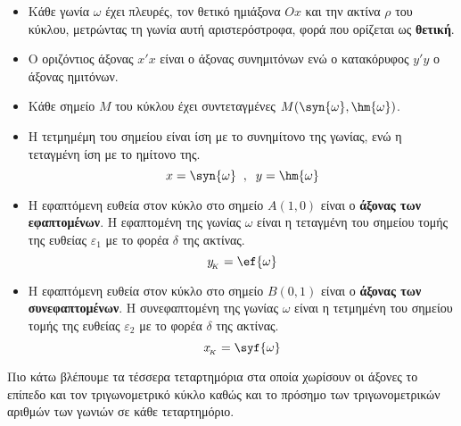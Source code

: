 \documentclass[twoside,10pt]{book}
\begin{document}
\begin{itemize}[itemsep=0mm]
\item Κάθε γωνία $ \omega $ έχει πλευρές, τον θετικό ημιάξονα $ Ox $ και την ακτίνα $ \rho $ του κύκλου, μετρώντας τη γωνία αυτή αριστερόστροφα, φορά που ορίζεται ως \textbf{θετική}.
\item Ο οριζόντιος άξονας $ x'x $ είναι ο άξονας συνημιτόνων ενώ ο κατακόρυφος $ y'y $ ο άξονας ημιτόνων.
\item Κάθε σημείο $ M $ του κύκλου έχει συντεταγμένες $ M(\syn{\omega},\hm{\omega}) $.
\item Η τετμημέμη του σημείου είναι ίση με το συνημίτονο της γωνίας, ενώ η τεταγμένη ίση με το ημίτονο της.
\[ x=\syn{\omega}\;\;,\;\;y=\hm{\omega} \]
\item Η εφαπτόμενη ευθεία στον κύκλο στο σημείο $ A(1,0) $ είναι ο \textbf{άξονας των εφαπτομένων}. Η εφαπτομένη της γωνίας $ \omega $ είναι η τεταγμένη του σημείου τομής της ευθείας $ \varepsilon_1 $ με το φορέα $ \delta $ της ακτίνας.
\[ y_{\!_K}=\ef{\omega} \]
\item Η εφαπτόμενη ευθεία στον κύκλο στο σημείο $ B(0,1) $ είναι ο \textbf{άξονας των συνεφαπτομένων}. Η συνεφαπτομένη της γωνίας $ \omega $ είναι η τετμημένη του σημείου τομής της ευθείας $ \varepsilon_2 $ με το φορέα $ \delta $ της ακτίνας.
\[ x_{\!_K}=\syf{\omega} \]	
\end{itemize}
Πιο κάτω βλέπουμε τα τέσσερα τεταρτημόρια στα οποία χωρίσουν οι άξονες το επίπεδο και τον τριγωνομετρικό κύκλο καθώς και το πρόσημο των τριγωνομετρικών αριθμών των γωνιών σε κάθε τεταρτημόριο.
\end{document}
